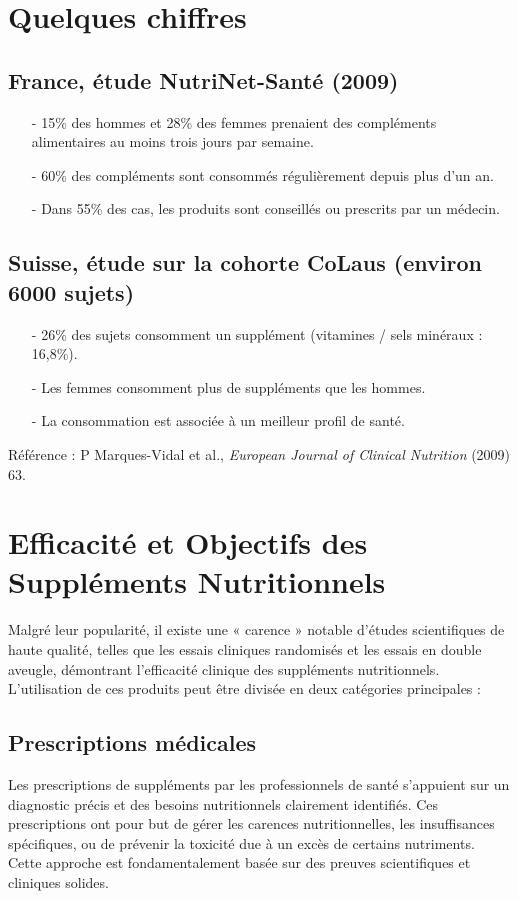\documentclass[11pt]{article}
\begin{document}
\section{Quelques chiffres}

\subsection{France, étude NutriNet-Santé (2009)}
\begin{itemize}
    \item[-] 15\% des hommes et 28\% des femmes prenaient des compléments alimentaires au moins trois jours par semaine.
    \item[-] 60\% des compléments sont consommés régulièrement depuis plus d'un an.
    \item[-] Dans 55\% des cas, les produits sont conseillés ou prescrits par un médecin.
\end{itemize}

\subsection{Suisse, étude sur la cohorte CoLaus (environ 6000 sujets)}
\begin{itemize}
    \item[-] 26\% des sujets consomment un supplément (vitamines / sels minéraux : 16,8\%).
    \item[-] Les femmes consomment plus de suppléments que les hommes.
    \item[-] La consommation est associée à un meilleur profil de santé.
\end{itemize}

Référence : P Marques-Vidal et al., \textit{European Journal of Clinical Nutrition} (2009) 63.

\section{Efficacité et Objectifs des Suppléments Nutritionnels}

Malgré leur popularité, il existe une « carence » notable d'études scientifiques de haute qualité, telles que les essais cliniques randomisés et les essais en double aveugle, démontrant l'efficacité clinique des suppléments nutritionnels. L'utilisation de ces produits peut être divisée en deux catégories principales :

\subsection{Prescriptions médicales}
Les prescriptions de suppléments par les professionnels de santé s'appuient sur un diagnostic précis et des besoins nutritionnels clairement identifiés. Ces prescriptions ont pour but de gérer les carences nutritionnelles, les insuffisances spécifiques, ou de prévenir la toxicité due à un excès de certains nutriments. Cette approche est fondamentalement basée sur des preuves scientifiques et cliniques solides.
\end{document}
